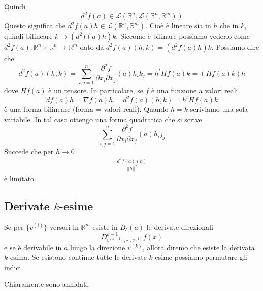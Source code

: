 \documentclass[a4paper]{article}
\begin{document}

Quindi
\[
    d^2f(a) \in \mathcal{L}(\mathbb{R}^n, \mathcal{L}(\mathbb{R}^n, \mathbb{R}^m))
\]
Questo significa che \(d^2f(a) h \in \mathcal{L}(\mathbb{R}^n, \mathbb{R}^m)\).
Cioè è lineare sia in \(h\) che in \(k\), quindi bilineare
\(k \to (d^2f(a)h)k\).
Siccome è bilinare possiamo vederlo come \(d^2f(a) \colon \mathbb{R}^n \times \mathbb{R}^n \to \mathbb{R}^m\)
dato da \(d^2f(a)(h,k) = (d^2f(a)h)k\).
Possiamo dire che
\[
    d^2f(a)(h,k) = \sum_{i,j=1}^n \frac{\partial^2 f}{\partial x_i \partial x_j}(a)h_ik_j
    = h^t Hf(a) k = (Hf(a)k)h
\]
dove \(Hf(a)\) è un tensore.
In particolare, se \(f\) è una funzione a valori reali
\[
    df(a) h = \nabla f(a) h, \quad
    d^2f(a)(h,k) = h^t Hf(a) k
\]
è una forma bilineare (forma = valori reali).
Quando \(h=k\) scriviamo una sola variabile.
In tal caso ottengo una forma quadratica che si scrive
\[
    \sum_{i,j=1}^n \frac{\partial^2 f}{\partial x_i \partial x_j}(a)h_ij_j    
\]
Succede che per \(h \to 0\)
\begin{align*}
    \frac{d^2f(a)(h)}{||h||^2}
\end{align*}
è limitato.


\subsection{Derivate \(k\)-esime}

Se per \(\{v^{(i)}\}\) versori in \(\mathbb{R}^m\)
esiste in \(B_\delta(a)\) le derivate direzionali
\[
    D_{v^{(k-1)}, \cdots, v^{(1)}}^{k-1}f(x)
\]
e se è derivabile in \(a\) lungo la direzione \(v^{(k)}\),
allora diremo che esiste la derivata \(k\)-esima.
Se esistono continue tutte le derivate \(k\) esime possiamo permutare gli indici.


Chiaramente sono annidati.
\end{document}
